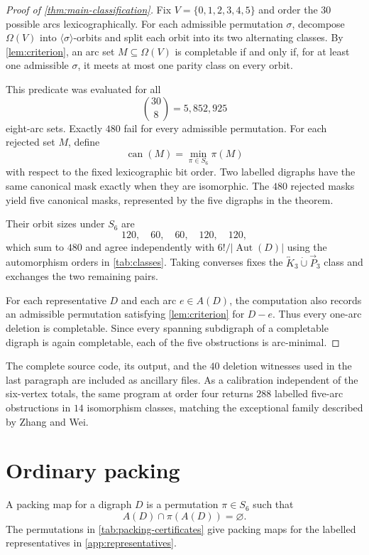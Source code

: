 \documentclass[11pt,reqno]{amsart}
\theoremstyle{definition}
\newcommand{\bK}[1]{\overleftrightarrow{K}_{#1}}
\newcommand{\dP}{\overrightarrow{P}_{3}}
\newcommand{\dunion}{\mathbin{\dot\cup}}
\newcommand{\Aut}{\operatorname{Aut}}
\newcommand{\can}{\operatorname{can}}
\begin{document}
\begin{proof}[Proof of \cref{thm:main-classification}]
Fix \(V=\{0,1,2,3,4,5\}\) and order the \(30\) possible arcs lexicographically. For each admissible permutation \(\sigma\), decompose \(\Omega(V)\) into \(\langle\sigma\rangle\)-orbits and split each orbit into its two alternating classes. By \cref{lem:criterion}, an arc set \(M\subseteq\Omega(V)\) is completable if and only if, for at least one admissible \(\sigma\), it meets at most one parity class on every orbit.

This predicate was evaluated for all
\[
\binom{30}{8}=5{,}852{,}925
\]
eight-arc sets. Exactly \(480\) fail for every admissible permutation. For each rejected set \(M\), define
\[
\can(M)=\min_{\pi\in S_6}\pi(M)
\]
with respect to the fixed lexicographic bit order. Two labelled digraphs have the same canonical mask exactly when they are isomorphic. The \(480\) rejected masks yield five canonical masks, represented by the five digraphs in the theorem.

Their orbit sizes under \(S_6\) are
\[
120,\quad 60,\quad 60,\quad 120,\quad 120,
\]
which sum to \(480\) and agree independently with \(6!/|\Aut(D)|\) using the automorphism orders in \cref{tab:classes}. Taking converses fixes the \(\bK{3}\dunion\dP\) class and exchanges the two remaining pairs.

For each representative \(D\) and each arc \(e\in A(D)\), the computation also records an admissible permutation satisfying \cref{lem:criterion} for \(D-e\). Thus every one-arc deletion is completable. Since every spanning subdigraph of a completable digraph is again completable, each of the five obstructions is arc-minimal.
\end{proof}

The complete source code, its output, and the \(40\) deletion witnesses used in the last paragraph are included as ancillary files. As a calibration independent of the six-vertex totals, the same program at order four returns \(288\) labelled five-arc obstructions in \(14\) isomorphism classes, matching the exceptional family described by Zhang and Wei.

\section{Ordinary packing}\label{sec:packing-separation}

A packing map for a digraph \(D\) is a permutation \(\pi\in S_6\) such that
\[
A(D)\cap\pi(A(D))=\varnothing.
\]
The permutations in \cref{tab:packing-certificates} give packing maps for the labelled representatives in \cref{app:representatives}.
\end{document}
